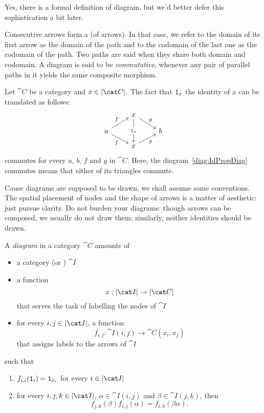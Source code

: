 Yes, there is a formal definition of diagram, but we'd better defer this sophistication a bit later.

Consecutive arrows form a  (of arrows). In that case, we refer to the domain of its first arrow as the domain of the path and to the codomain of the last one as the codomain of the path. Two paths are said  when they share both domain and codomain. A diagram is said to be {\em commutative}, whenever any pair of parallel paths in it yields the same composite morphism.

\begin{example}
Let \(\cat C\) be a category and \(x \in \obj{\cat C}\). The fact that \(\mathtt 1_x\) the identity of \(x\) can be translated as follows:
\begin{equation}\begin{tikzcd}[row sep=small]
 & x \ar["{\id_x}" description, dd] \ar["g", dr] & \\
a \ar["f", ur] \ar["f", dr, swap] & &  b \\
  & x \ar["g", ur, swap] &
\end{tikzcd}\label{diag:IdPropDiag}\end{equation}
commutes for every \(a\), \(b\), \(f\) and \(g\) in \(\cat C\). Here, the diagram~\eqref{diag:IdPropDiag} commutes means that either of its triangles commute.
\end{example}

\begin{example}
\end{example}

Cause diagrams are supposed to be drawn, we shall assume some conventions. The spatial placement of nodes and the shape of arrows is a matter of aesthetic: just pursue clarity. Do not burden your diagrams: though arrows can be composed, we usually do not draw them; similarly, neither identities should be drawn.


\begin{definition}[Diagrams]
A {\em diagram} in a category \(\cat C\) amounts of
\begin{itemize}
\item a category  (or ) \(\cat I\)
\item a function
\[x : \obj{\cat I} \to \obj{\cat C}\]
that serves the task of labelling the nodes of \(\cat I\)
\item for every \(i, j \in \obj{\cat I}\), a function
\[f_{i, j} : \cat I (i, j) \to \cat C(x_i, x_j)\]
that assigns labels to the arrows of \(\cat I\)
\end{itemize}
such that
\begin{enumerate}
\item \(f_{i, i}(\mathtt 1_i) = \mathtt 1_{x_i}\) for every \(i \in \obj{\cat I}\)
\item for every \(i, j, k \in \obj{\cat I}\), \(\alpha \in \cat I(i, j)\) and \(\beta \in \cat I(j, k)\), then
\[f_{j, k}(\beta) f_{i, j}(\alpha) = f_{i, k}(\beta\alpha) .\]
\end{enumerate}
\end{definition}

